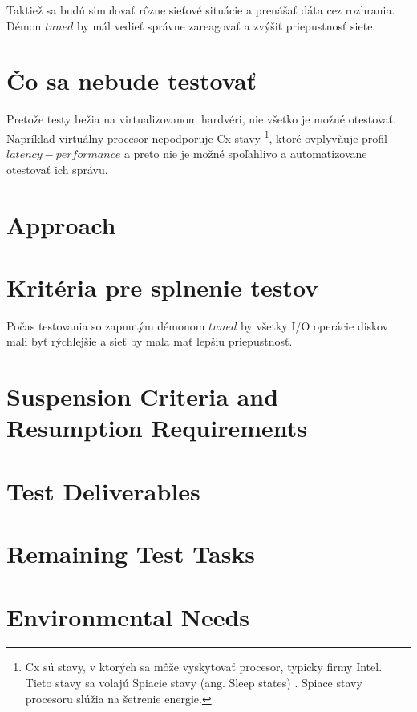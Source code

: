 Taktiež sa budú simulovať rôzne sieťové situácie a prenášať dáta cez rozhrania.
Démon $tuned$ by mál vedieť správne zareagovať a zvýšiť priepustnosť siete.

\section{Čo sa nebude testovať}
Pretože testy bežia na virtualizovanom hardvéri, nie všetko je možné otestovať.
Napríklad virtuálny procesor nepodporuje Cx stavy \footnote{Cx sú stavy, v
ktorých sa môže vyskytovať procesor, typicky firmy Intel. Tieto stavy sa volajú
Spiacie stavy (ang. Sleep states) \cite{sleepStates}. Spiace stavy procesoru
slúžia na šetrenie energie.}, ktoré ovplyvňuje profil $latency-performance$ a
preto nie je možné spoľahlivo a automatizovane otestovať ich správu.

\section{Approach}
\section{Kritéria pre splnenie testov}
Počas testovania so zapnutým démonom $tuned$ by všetky I/O operácie diskov mali
byť rýchlejšie a sieť by mala mať lepšiu priepustnosť.

\section{Suspension Criteria and Resumption Requirements}
\section{Test Deliverables}
\section{Remaining Test Tasks}
\section{Environmental Needs}
